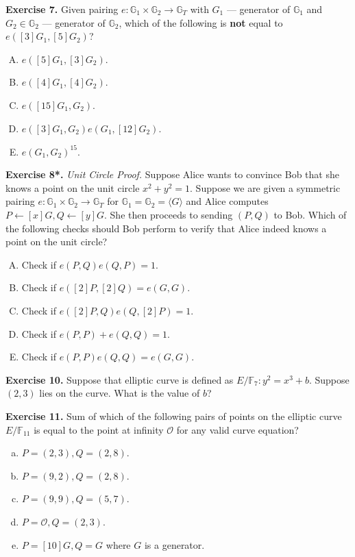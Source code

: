 \documentclass[../lecture-notes-148x210.tex]{subfiles}
\begin{document}
\textbf{Exercise 7.} Given pairing $e: \mathbb{G}_1 \times \mathbb{G}_2 \to \mathbb{G}_T$ with $G_1$ --- generator of $\mathbb{G}_1$ and $G_2 \in \mathbb{G}_2$ --- generator of $\mathbb{G}_2$, which of the following is \textbf{not} equal to $e([3]G_1, [5]G_2)$?
\begin{multicols}{2}
    \begin{enumerate}[(A)]
        \item $e([5]G_1, [3]G_2)$.
        \item $e([4]G_1, [4]G_2)$.
        \item $e([15]G_1, G_2)$.
        \item $e([3]G_1,G_2)e(G_1,[12]G_2)$.
        \item $e(G_1, G_2)^{15}$.
    \end{enumerate} 
\end{multicols}

\textbf{Exercise 8*.} \textit{Unit Circle Proof.} Suppose Alice wants to convince Bob that she knows a point on the unit circle $x^2+y^2=1$. Suppose we are given a symmetric pairing $e: \mathbb{G}_1 \times \mathbb{G}_2 \to \mathbb{G}_T$ for $\mathbb{G}_1=\mathbb{G}_2=\langle G \rangle$ and Alice computes $P \gets [x]G, Q \gets [y]G$. She then proceeds to sending $(P,Q)$ to Bob. Which of the following checks should Bob perform to verify that Alice indeed knows a point on the unit circle?
\begin{enumerate}[(A)]
    \item Check if $e(P,Q)e(Q,P)=1$.
    \item Check if $e([2]P,[2]Q) = e(G,G)$.
    \item Check if $e([2]P,Q)e(Q,[2]P) = 1$.
    \item Check if $e(P,P)+e(Q,Q) = 1$.
    \item Check if $e(P,P)e(Q,Q)=e(G,G)$.
\end{enumerate}

\textbf{Exercise 10.} Suppose that elliptic curve is defined as $E/\mathbb{F}_{7}: y^2=x^3+b$. Suppose $(2,3)$ lies on the curve. What is the value of $b$?

\textbf{Exercise 11.} Sum of which of the following pairs of points on the elliptic curve $E/\mathbb{F}_{11}$ is equal to the point at infinity $\mathcal{O}$ for any valid curve equation?
\begin{multicols}{2}    
    \begin{enumerate}[a)]
        \item $P=(2,3),Q=(2,8)$.
        \item $P=(9,2),Q=(2,8)$.
        \item $P=(9,9),Q=(5,7)$.
        \item $P=\mathcal{O},Q=(2,3)$.
        \item $P=[10]G,Q=G$ where $G$ is a generator.
    \end{enumerate}
\end{multicols}
\end{document}
